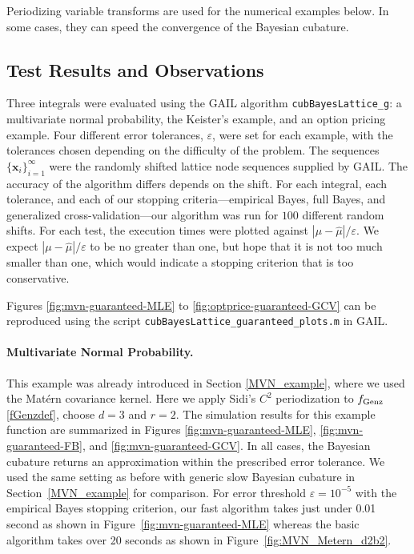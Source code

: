 \documentclass[twocolumn]{svjour3}          %
\newcommand{\bm}[1]{\boldsymbol{#1}}
\newcommand{\vx}{\bm{x}}
\newcommand{\hmu}{\widehat{\mu}}
\newcommand{\code}[1]{\texttt{#1}}
\def\abs#1{\ensuremath{\left \lvert #1 \right \rvert}}
\newcommand\figref{Figure~\ref}
\newcommand\secref{Section~\ref}
\begin{document}
Periodizing variable transforms are used for the numerical examples below. In some cases, they can speed the convergence of the Bayesian cubature. 
	



\subsection{Test Results and Observations}

Three integrals were evaluated using the GAIL algorithm \code{cubBayesLattice\_g}:  a multivariate normal probability, the Keister's example, and an option pricing example.  Four different error tolerances, $\varepsilon$,  were set for each example, with the tolerances chosen depending on the difficulty of the problem.  The sequences $\{\vx_i\}_{i=1}^\infty$ were the randomly shifted lattice node sequences supplied by GAIL. The accuracy of the algorithm differs depends on the shift. For each integral,  each tolerance, and each of our stopping criteria---empirical Bayes, full Bayes, and generalized cross-validation---our algorithm was run for $100$ different random shifts.  For each test, the execution times were plotted against $\abs{\mu - \hmu}/\varepsilon$.  We expect $\abs{\mu - \hmu}/\varepsilon$ to be no greater than one, but hope that it is not too much smaller than one, which would indicate a stopping criterion that is too conservative. 

Figures \ref{fig:mvn-guaranteed-MLE} to \ref{fig:optprice-guaranteed-GCV} can be reproduced using the script \code{cubBayesLattice\_guaranteed\_plots.m} in GAIL.


\paragraph{Multivariate Normal Probability.}

This example was already introduced in Section \ref{MVN_example}, where we used the Mat\'ern covariance kernel.  Here we apply Sidi's $C^2$  periodization to $ f_{\textup{Genz}}$ \eqref{fGenzdef}, choose $d=3$ and $r=2$. The simulation results for this example function are summarized in Figures \ref{fig:mvn-guaranteed-MLE}, \ref{fig:mvn-guaranteed-FB}, and \ref{fig:mvn-guaranteed-GCV}.  In all cases, the Bayesian cubature returns an approximation within the prescribed error tolerance. We used the same setting as before with generic slow Bayesian cubature in \secref{MVN_example} for comparison. For error threshold $\varepsilon=10^{-5}$ with the empirical Bayes stopping criterion, our fast algorithm takes just under 0.01 second as shown in \figref{fig:mvn-guaranteed-MLE} whereas the basic algorithm takes over 20 seconds as shown in \figref{fig:MVN_Metern_d2b2}. 
\end{document}
